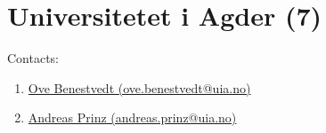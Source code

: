 \section{Universitetet i Agder (7)}
\label{sec:UiA}

Contacts:
\begin{enumerate}
 \item {}\href{mailto:ove.benestvedt@uia.no}{Ove Benestvedt (ove.benestvedt@uia.no)}
 \item {}\href{mailto:andreas.prinz@uia.no}{Andreas Prinz (andreas.prinz@uia.no)}
\end{enumerate}

